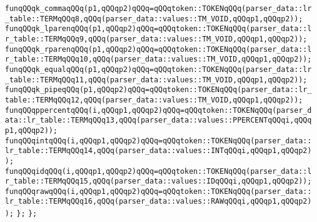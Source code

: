 \verb|funqQQqk_commaqQQq(p1,qQQqp2)qQQq=qQQqtoken::TOKENqQQq(parser_data::lr_table::TERMqQQq8,qQQq(parser_data::values::TM_VOID,qQQqp1,qQQqp2));|\newline
\verb|funqQQqk_lparenqQQq(p1,qQQqp2)qQQq=qQQqtoken::TOKENqQQq(parser_data::lr_table::TERMqQQq9,qQQq(parser_data::values::TM_VOID,qQQqp1,qQQqp2));|\newline
\verb|funqQQqk_rparenqQQq(p1,qQQqp2)qQQq=qQQqtoken::TOKENqQQq(parser_data::lr_table::TERMqQQq10,qQQq(parser_data::values::TM_VOID,qQQqp1,qQQqp2));|\newline
\verb|funqQQqk_equalqQQq(p1,qQQqp2)qQQq=qQQqtoken::TOKENqQQq(parser_data::lr_table::TERMqQQq11,qQQq(parser_data::values::TM_VOID,qQQqp1,qQQqp2));|\newline
\verb|funqQQqk_pipeqQQq(p1,qQQqp2)qQQq=qQQqtoken::TOKENqQQq(parser_data::lr_table::TERMqQQq12,qQQq(parser_data::values::TM_VOID,qQQqp1,qQQqp2));|\newline
\verb|funqQQqppercentqQQq(i,qQQqp1,qQQqp2)qQQq=qQQqtoken::TOKENqQQq(parser_data::lr_table::TERMqQQq13,qQQq(parser_data::values::PPERCENTqQQqi,qQQqp1,qQQqp2));|\newline
\verb|funqQQqintqQQq(i,qQQqp1,qQQqp2)qQQq=qQQqtoken::TOKENqQQq(parser_data::lr_table::TERMqQQq14,qQQq(parser_data::values::INTqQQqi,qQQqp1,qQQqp2));|\newline
\verb|funqQQqidqQQq(i,qQQqp1,qQQqp2)qQQq=qQQqtoken::TOKENqQQq(parser_data::lr_table::TERMqQQq15,qQQq(parser_data::values::IDqQQqi,qQQqp1,qQQqp2));|\newline
\verb|funqQQqrawqQQq(i,qQQqp1,qQQqp2)qQQq=qQQqtoken::TOKENqQQq(parser_data::lr_table::TERMqQQq16,qQQq(parser_data::values::RAWqQQqi,qQQqp1,qQQqp2));|\newline
\verb|};|\newline
\verb|};|\newline

